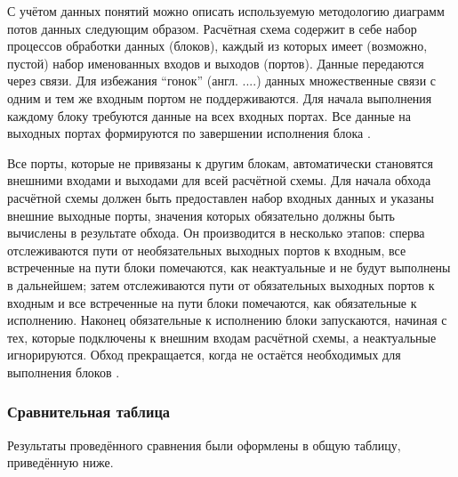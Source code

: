 С учётом данных понятий можно описать используемую методологию диаграмм потов данных следующим образом. Расчётная схема содержит в себе набор процессов обработки данных (блоков), каждый из которых имеет (возможно, пустой) набор именованных входов и выходов (портов). Данные передаются через связи. Для избежания ``гонок'' (англ. ....) данных множественные связи с одним и тем же входным портом не поддерживаются. Для начала выполнения каждому блоку требуются данные на всех входных портах. Все данные на выходных портах формируются по завершении исполнения блока \cite{Nazarenko2015}.

Все порты, которые не привязаны к другим блокам, автоматически становятся внешними входами и выходами для всей расчётной схемы. Для начала обхода расчётной схемы должен быть предоставлен набор входных данных и указаны внешние выходные порты, значения которых обязательно должны быть вычислены в результате обхода. Он производится в несколько этапов: сперва отслеживаются пути от необязательных выходных портов к входным, все встреченные на пути блоки помечаются, как неактуальные и не будут выполнены в дальнейшем; затем отслеживаются пути от обязательных выходных портов к входным и все встреченные на пути блоки помечаются, как обязательные к исполнению. Наконец обязательные к исполнению блоки запускаются, начиная с тех, которые подключены к внешним входам расчётной схемы, а неактуальные игнорируются. Обход прекращается, когда не остаётся необходимых для выполнения блоков \cite{Nazarenko2015}. 


\subsubsection{Сравнительная таблица}

Результаты проведённого сравнения были оформлены в общую таблицу, приведённую ниже.


